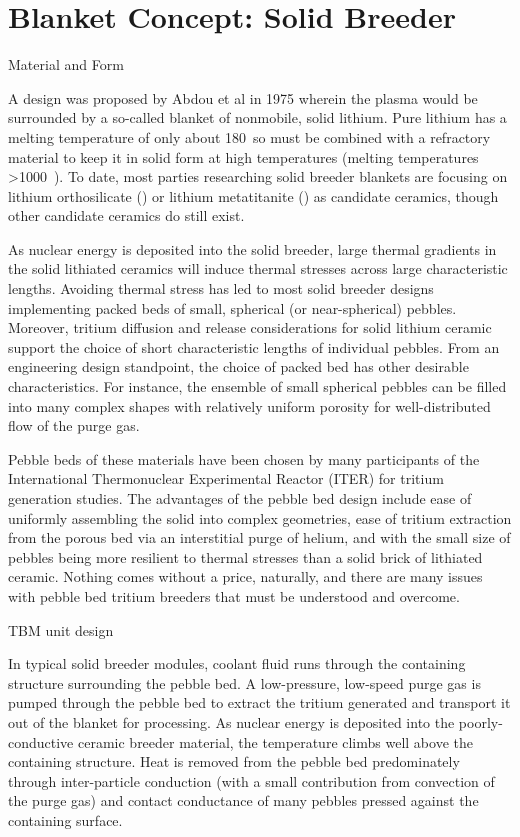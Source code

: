 \section{Blanket Concept: Solid Breeder}\label{sec:blanket-design}

Material and Form

A design was proposed by Abdou et al\cite{Abdou1974d} in 1975 wherein the plasma would be surrounded by a so-called blanket of nonmobile, solid lithium. Pure lithium has a melting temperature of only about 180~\celsius so must be combined with a refractory material to keep it in solid form at high temperatures (melting temperatures >1000~\celsius). To date, most parties researching solid breeder blankets are focusing on lithium orthosilicate (\lis) or lithium metatitanite (\lit) as candidate ceramics, though other candidate ceramics do still exist.

As nuclear energy is deposited into the solid breeder, large thermal gradients in the solid lithiated ceramics will induce thermal stresses across large characteristic lengths. Avoiding thermal stress has led to most solid breeder designs implementing packed beds of small, spherical (or near-spherical) pebbles. Moreover, tritium diffusion and release considerations for solid lithium ceramic support the choice of short characteristic lengths of individual pebbles. From an engineering design standpoint, the choice of packed bed has other desirable characteristics. For instance, the ensemble of small spherical pebbles can be filled into many complex shapes with relatively uniform porosity for well-distributed flow of the purge gas. 

Pebble beds of these materials have been chosen by many participants of the International Thermonuclear Experimental Reactor (ITER) for tritium generation studies.\cite{Lulewicz2002, Mandal2012a, Tsuchiya1998, Cho2012} The advantages of the pebble bed design include ease of uniformly assembling the solid into complex geometries, ease of tritium extraction from the porous bed via an interstitial purge of helium, and with the small size of pebbles being more resilient to thermal stresses than a solid brick of lithiated ceramic.\cite{Casadio2004} Nothing comes without a price, naturally, and there are many issues with pebble bed tritium breeders that must be understood and overcome.

TBM unit design

In typical solid breeder modules, coolant fluid runs through the containing structure surrounding the pebble bed. A low-pressure, low-speed purge gas is pumped through the pebble bed to extract the tritium generated and transport it out of the blanket for processing. As nuclear energy is deposited into the poorly-conductive ceramic breeder material, the temperature climbs well above the containing structure. Heat is removed from the pebble bed predominately through inter-particle conduction (with a small contribution from convection of the purge gas) and contact conductance of many pebbles pressed against the containing surface. 


